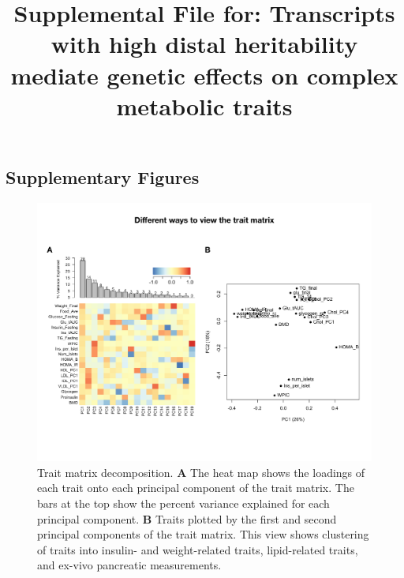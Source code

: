 \documentclass[
]{article}
\title{Supplemental File for: Transcripts with high distal heritability
mediate genetic effects on complex metabolic traits}
\author{}
\date{\vspace{-2.5em}}
\newcommand{\beginsupplement}{
	\renewcommand{\figurename}{Supplementary Figure}
	\setcounter{figure}{0}
}
\begin{document}
\maketitle

\beginsupplement

\subsection{Supplementary Figures}\label{supplementary-figures}

\begin{figure}[ht!]
\includegraphics[width=\textwidth]{Figures/Supp_Fig_Trait_Decomposition.pdf} 
\caption{Trait matrix decomposition. \textbf{A} The heat map 
shows the loadings of each trait onto each principal component 
of the trait matrix. The bars at the top show the percent variance 
explained for each principal component. \textbf{B} Traits plotted 
by the first and second principal components of the trait matrix. 
This view shows clustering of traits into insulin- and 
weight-related traits, lipid-related traits, and ex-vivo 
pancreatic measurements.
}
\label{fig:trait_decomp}
\end{figure}
\end{document}
